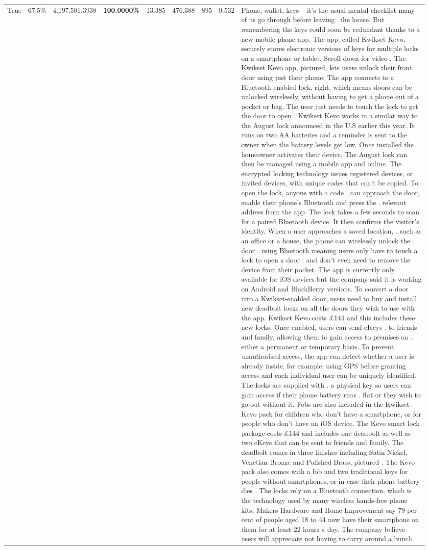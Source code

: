 \begin{table}[H]
\begin{tabular}{lllrlllll}
True & 67.5\% & 4,197,501.3938 & \bfseries \color{red} 100.0000\% & 13.385 & 476.388 & 895 & 0.532 & Phone, wallet, keys – it’s the usual mental checklist many of us go through before leaving  the house. But remembering the keys could soon be redundant thanks to a new mobile phone app. The app, called Kwikset Kevo, securely stores electronic versions of keys for multiple locks on a smartphone or tablet. Scroll down for video . The Kwikset Kevo app, pictured, lets users unlock their front door using just their phone. The app connects to a Bluetooth enabled lock, right, which means doors can be unlocked wirelessly, without having to get a phone out of a pocket or bag. The user just needs to touch the lock to get the door to open . Kwikset Kevo works in a similar way to the August lock announced in the U.S earlier this year. It runs on two AA batteries and a reminder is sent to the owner when the battery levels get low. Once installed the homeowner activates their device. The August lock can then be managed using a mobile app and online. The encrypted locking technology issues registered devices, or invited devices, with unique codes that can't be copied. To open the lock, anyone with a code . can approach the door, enable their phone's Bluetooth and press the . relevant address from the app. The lock takes a few seconds to scan for a paired Bluetooth device. It then confirms the visitor's identity. When a user approaches a saved location, . such as an office or a house, the phone can wirelessly unlock the door . using Bluetooth meaning users only have to touch a lock to open a door . and don't even need to remove the device from their pocket. The app is currently only available for iOS devices but the company said it is working on Android and BlackBerry versions. To convert a door into a Kwikset-enabled door, users need to buy and install new deadbolt locks on all the doors they wish to use with the app. Kwikset Kevo costs £144 and this includes these new locks. Once enabled, users can send eKeys . to friends and family, allowing them to gain access to premises on . either a permanent or temporary basis. To prevent unauthorised access, the app can detect whether a user is already inside, for example, using GPS before granting access and each individual user can be uniquely identified. The locks are supplied with . a physical key so users can gain access if their phone battery runs . flat or they wish to go out without it. Fobs are also included in the Kwikset Kevo pack for children who don't have a smartphone, or for people who don't have an iOS device. The Kevo smart lock package costs £144 and includes one deadbolt as well as two eKeys that can be sent to friends and family. The deadbolt comes in three finishes including Satin Nickel, Venetian Bronze and Polished Brass, pictured . The Kevo pack also comes with a fob and two traditional keys for people without smartphones, or in case their phone battery dies . The locks rely on a Bluetooth connection, which is the technology used by many wireless hands-free phone kits. Makers Hardware and Home Improvement say 79 per cent of people aged 18 to 44 now have their smartphone on them for at least 22 hours a day. The company believe users will appreciate not having to carry around a bunch 
\end{tabular}
\end{table}
